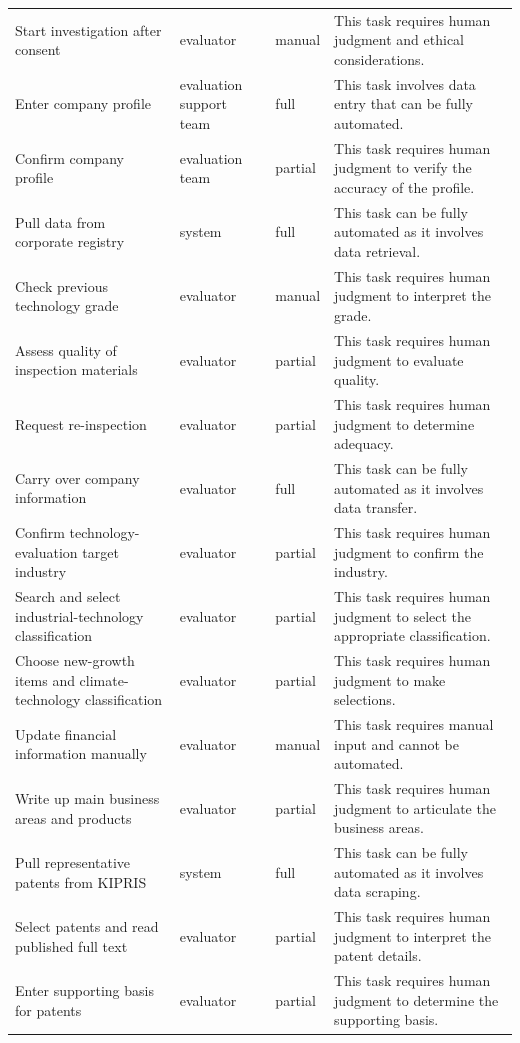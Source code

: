 \begin{longtable}{@{}p{4.4cm}p{2.6cm}p{1.4cm}p{5.2cm}@{}}
Start investigation after consent & evaluator & manual & This task requires human judgment and ethical considerations. \\
Enter company profile & evaluation support team & full & This task involves data entry that can be fully automated. \\
Confirm company profile & evaluation team & partial & This task requires human judgment to verify the accuracy of the profile. \\
Pull data from corporate registry & system & full & This task can be fully automated as it involves data retrieval. \\
Check previous technology grade & evaluator & manual & This task requires human judgment to interpret the grade. \\
Assess quality of inspection materials & evaluator & partial & This task requires human judgment to evaluate quality. \\
Request re-inspection & evaluator & partial & This task requires human judgment to determine adequacy. \\
Carry over company information & evaluator & full & This task can be fully automated as it involves data transfer. \\
Confirm technology-evaluation target industry & evaluator & partial & This task requires human judgment to confirm the industry. \\
Search and select industrial-technology classification & evaluator & partial & This task requires human judgment to select the appropriate classification. \\
Choose new-growth items and climate-technology classification & evaluator & partial & This task requires human judgment to make selections. \\
Update financial information manually & evaluator & manual & This task requires manual input and cannot be automated. \\
Write up main business areas and products & evaluator & partial & This task requires human judgment to articulate the business areas. \\
Pull representative patents from KIPRIS & system & full & This task can be fully automated as it involves data scraping. \\
Select patents and read published full text & evaluator & partial & This task requires human judgment to interpret the patent details. \\
Enter supporting basis for patents & evaluator & partial & This task requires human judgment to determine the supporting basis. \\

\end{longtable}
